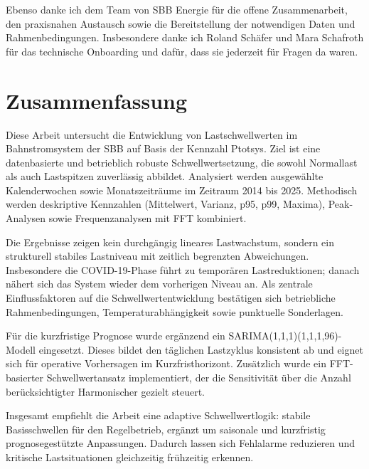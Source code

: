 \documentclass[12pt,oneside]{article}
\begin{document}
Ebenso danke ich dem Team von SBB Energie für die offene Zusammenarbeit, den praxisnahen Austausch sowie die Bereitstellung der notwendigen Daten und Rahmenbedingungen. Insbesondere danke ich Roland Schäfer und Mara Schafroth für das technische Onboarding und dafür, dass sie jederzeit für Fragen da waren.

\clearpage

\section*{Zusammenfassung}
Diese Arbeit untersucht die Entwicklung von Lastschwellwerten im
Bahnstromsystem der SBB auf Basis der Kennzahl Ptotsys. Ziel ist eine
datenbasierte und betrieblich robuste Schwellwertsetzung, die sowohl
Normallast als auch Lastspitzen zuverlässig abbildet. Analysiert werden
ausgewählte Kalenderwochen sowie Monatszeiträume im Zeitraum 2014 bis 2025.
Methodisch werden deskriptive Kennzahlen (Mittelwert, Varianz, p95, p99,
Maxima), Peak-Analysen sowie Frequenzanalysen mit FFT kombiniert.

Die Ergebnisse zeigen kein durchgängig lineares Lastwachstum, sondern ein
strukturell stabiles Lastniveau mit zeitlich begrenzten Abweichungen.
Insbesondere die COVID-19-Phase führt zu temporären Lastreduktionen; danach
nähert sich das System wieder dem vorherigen Niveau an. Als zentrale
Einflussfaktoren auf die Schwellwertentwicklung bestätigen sich betriebliche
Rahmenbedingungen, Temperaturabhängigkeit sowie punktuelle Sonderlagen.

Für die kurzfristige Prognose wurde ergänzend ein
SARIMA(1,1,1)(1,1,1,96)-Modell eingesetzt. Dieses bildet den täglichen
Lastzyklus konsistent ab und eignet sich für operative Vorhersagen im
Kurzfristhorizont. Zusätzlich wurde ein FFT-basierter Schwellwertansatz
implementiert, der die Sensitivität über die Anzahl berücksichtigter
Harmonischer gezielt steuert.

Insgesamt empfiehlt die Arbeit eine adaptive Schwellwertlogik: stabile
Basisschwellen für den Regelbetrieb, ergänzt um saisonale und kurzfristig
prognosegestützte Anpassungen. Dadurch lassen sich Fehlalarme reduzieren und
kritische Lastsituationen gleichzeitig frühzeitig erkennen.

\clearpage
\tableofcontents
\listoffigures
\listoftables

\clearpage
{}
\setcounter{page}{1}
\end{document}

